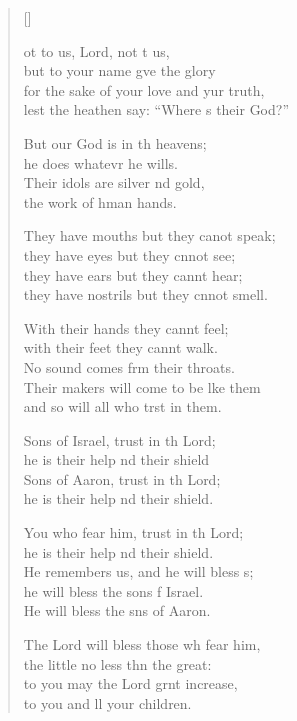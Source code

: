 \settowidth{\versewidth}{for the sake of your love and your truth, *}
\begin{verse}[\versewidth]
  \begin{patverse}
ot to us, Lord, not t us,\Med\\
but to your name gve the glory\\
for the sake of your love and yur truth,\Med\\
lest the heathen say: “Where s their God?”

But our God is in th heavens;\Med\\
he does whatevr he wills.\\
Their idols are silver nd gold,\Med\\
the work of hman hands.

They have mouths but they canot speak;\Med\\
they have eyes but they cnnot see;\\
they have ears but they cannt hear;\Med\\
they have nostrils but they cnnot smell.

With their hands they cannt feel;\Flex\\
with their feet they cannt walk.\Med\\
No sound comes frm their throats.\\
Their makers will come to be l\pointup{\i}ke them\Med\\
and so will all who trst in them.

Sons of Israel, trust in th Lord;\Med\\
he is their help nd their shield\\
Sons of Aaron, trust in th Lord;\Med\\
he is their help nd their shield.

You who fear him, trust in th Lord;\Med\\
he is their help nd their shield.\\
He remembers us, and he will bless s;\Flex\\
he will bless the sons f Israel.\Med\\
He will bless the sns of Aaron.

The Lord will bless those wh fear him,\Med\\
the little no less thn the great:\\
to you may the Lord grnt increase,\Med\\
to you and ll your children.


\end{patverse}
\end{verse}
